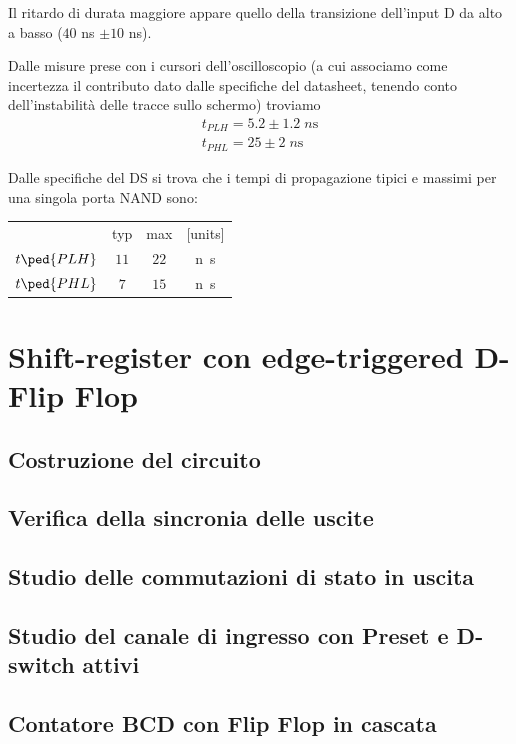 \documentclass[10pt, a4paper, italian]{article}
\begin{document}
Il ritardo di durata maggiore appare quello della transizione dell'input D da alto a basso ($40$ ns $\pm 10$ ns).

Dalle misure prese con i cursori dell'oscilloscopio (a cui associamo come
incertezza il contributo dato dalle specifiche del datasheet, tenendo conto
dell'instabilità delle tracce sullo schermo) troviamo
\begin{align*}
    t_{PLH}= 5.2 \pm 1.2 \; \si{n\s} \\
    t_{PHL}= 25 \pm 2 \; \si{n\s}
\end{align*}

Dalle specifiche del DS si trova che i tempi di propagazione tipici e massimi
per una singola porta NAND sono:
\begin{table}[htbp]
\centering
\begin{tabular}{cccc}
	& typ & max & [units] \\
    $t\ped{PLH}$ & $11$ & $22$ & \si{n\s} \\
    $t\ped{PHL}$ & $7$ & $15$ & \si{n\s}
\end{tabular}
\end{table}

\section{Shift-register con edge-triggered D-Flip Flop}
\subsection{Costruzione del circuito}
\subsection{Verifica della sincronia delle uscite}
\subsection{Studio delle commutazioni di stato in uscita}
\subsection{Studio del canale di ingresso con Preset e D-switch attivi}
\subsection{Contatore BCD con Flip Flop in cascata}
\end{document}
